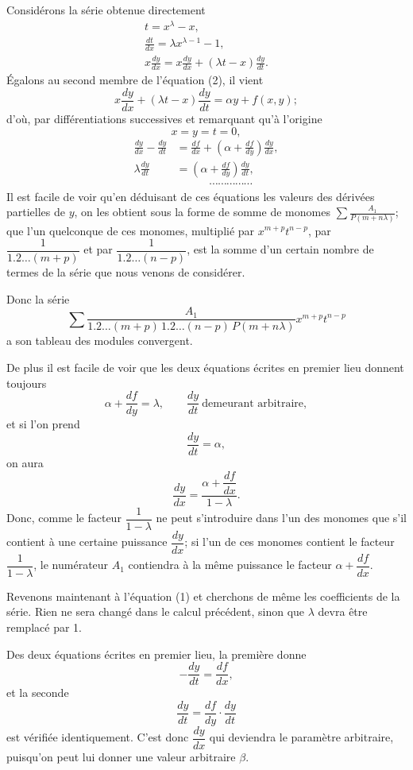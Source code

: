 \documentclass[11pt]{article}
\begin{document}
Considérons la série obtenue directement
\[
\begin{gathered}
t=x^\lambda-x,\\
\frac{dt}{dx}=\lambda x^{\lambda-1}-1,\\
x\frac{dy}{dx}=x\frac{dy}{dx}+(\lambda t-x)\frac{dy}{dt}.
\end{gathered}
\]
Égalons au second membre de l’équation (2), il vient
\[
x\frac{dy}{dx}+(\lambda t-x)\frac{dy}{dt}=\alpha y+f(x,y);
\]
d’où, par différentiations successives et remarquant qu’à l’origine
\[
x=y=t=0,
\]
\begin{align*}
\frac{dy}{dx}-\frac{dy}{dt}&=\frac{df}{dx}+\left(\alpha+\frac{df}{dy}\right)\frac{dy}{dx},\\
\lambda\frac{dy}{dt}&=\left(\alpha+\frac{df}{dy}\right)\frac{dy}{dt},\\[-0.2em]
&\hspace{3em}\cdots\cdots\cdots\cdots\cdots
\end{align*}
Il est facile de voir qu’en déduisant de ces équations les valeurs des dérivées partielles de $y$, on les obtient sous la forme de somme de monomes $\displaystyle\sum\frac{A_1}{P(m+n\lambda)}$; que l’un quelconque de ces monomes, multiplié par $x^{m+p}t^{n-p}$, par $\dfrac{1}{1.2\ldots(m+p)}$ et par $\dfrac{1}{1.2\ldots(n-p)}$, est la somme d’un certain nombre de termes de la série que nous venons de considérer.

Donc la série
\[
\sum\frac{A_1}{1.2\ldots(m+p)\,1.2\ldots(n-p)\,P(m+n\lambda)}x^{m+p}t^{n-p}
\]
a son tableau des modules convergent.

De plus il est facile de voir que les deux équations écrites en premier lieu donnent toujours
\[
\alpha+\frac{df}{dy}=\lambda,\qquad \frac{dy}{dt}\ \text{demeurant arbitraire},
\]
et si l’on prend
\[
\frac{dy}{dt}=\alpha,
\]
on aura
\[
\frac{dy}{dx}=\frac{\alpha+\dfrac{df}{dx}}{1-\lambda}.
\]
Donc, comme le facteur $\dfrac{1}{1-\lambda}$ ne peut s’introduire dans l’un des monomes que s’il contient à une certaine puissance $\dfrac{dy}{dx}$; si l’un de ces monomes contient le facteur $\dfrac{1}{1-\lambda}$, le numérateur $A_1$ contiendra à la même puissance le facteur $\alpha+\dfrac{df}{dx}$.

Revenons maintenant à l’équation (1) et cherchons de même les coefficients de la série. Rien ne sera changé dans le calcul précédent, sinon que $\lambda$ devra être remplacé par 1.

Des deux équations écrites en premier lieu, la première donne
\[
-\frac{dy}{dt}=\frac{df}{dx},
\]
et la seconde
\[
\frac{dy}{dt}=\frac{df}{dy}\cdot\frac{dy}{dt}
\]
est vérifiée identiquement. C’est donc $\dfrac{dy}{dx}$ qui deviendra le paramètre arbitraire, puisqu’on peut lui donner une valeur arbitraire $\beta$.
\end{document}
